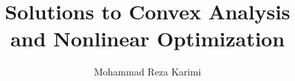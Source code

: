 \documentclass[leqno,11pt]{amsart}
\numberwithin{equation}{section}
\begin{document}
\title{Solutions to Convex Analysis\\and Nonlinear Optimization}
\author{Mohammad Reza Karimi}

\maketitle
\tableofcontents


\end{document}
